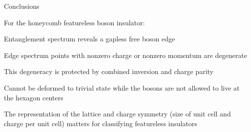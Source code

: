 \begin{frame}{Conclusions}
\vskip-1.5cm
\bi
\item[] For the honeycomb featureless boson insulator:
\item Entanglement spectrum reveals a gapless free boson edge
\item Edge spectrum points with nonzero charge or nonzero momentum are degenerate
\item This degeneracy is protected by combined inversion and charge parity
\item[]
\item Cannot be deformed to trivial state while the bosons are not allowed to live at the hexagon centers
\item The representation of the lattice and charge symmetry (size of unit cell and charge per unit cell) matters for classifying featureless insulators
\ei
\end{frame}